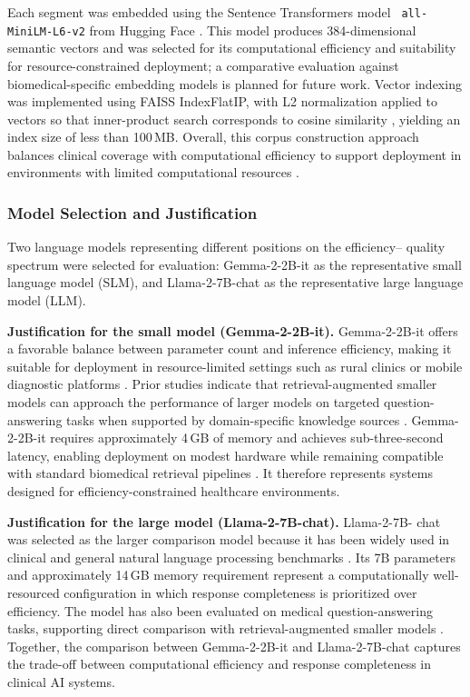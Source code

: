Each segment was embedded using the Sentence Transformers model \texttt{
all-MiniLM-L6-v2} from Hugging Face \cite{gu2020pubmedbert}. This model 
produces 384-dimensional semantic vectors and was selected for its 
computational efficiency and suitability for resource-constrained deployment; 
a comparative evaluation against biomedical-specific embedding models is 
planned for future work. Vector indexing was implemented using FAISS 
IndexFlatIP, with L2 normalization applied to vectors so that inner-product 
search corresponds to cosine similarity \cite{yang2025rag}, 
yielding an index size of less than 100\,MB. Overall, this corpus 
construction approach balances clinical coverage with computational efficiency 
to support deployment in environments with limited computational resources 
\cite{pezoulas2023generative, zamzmi2025smd}.

\subsubsection{Model Selection and Justification}

Two language models representing different positions on the efficiency--
quality spectrum were selected for evaluation: Gemma-2-2B-it  as the representative small language model (SLM), and 
Llama-2-7B-chat as the 
representative large language model (LLM).

\textbf{Justification for the small model (Gemma-2-2B-it).} Gemma-2-2B-it 
offers a favorable balance between parameter count and inference efficiency, 
making it suitable for deployment in resource-limited settings such as rural 
clinics or mobile diagnostic platforms \cite{xiong2024rag}. Prior studies 
indicate that retrieval-augmented smaller models can approach the performance 
of larger models on targeted question-answering tasks when supported by 
domain-specific knowledge sources \cite{yang2025rag, nishizaki2025reducing}. 
Gemma-2-2B-it requires approximately 4\,GB of memory and achieves 
sub-three-second latency, enabling deployment on modest hardware while 
remaining compatible with standard biomedical retrieval pipelines \cite{
zakka2023retrieval}. It therefore represents systems designed for 
efficiency-constrained healthcare environments.

\textbf{Justification for the large model (Llama-2-7B-chat).} Llama-2-7B-
chat was selected as the larger comparison model because it has been widely 
used in clinical and general natural language processing benchmarks \cite{
singhal2025toward}. Its 7B parameters and approximately 14\,GB memory 
requirement represent a computationally well-resourced configuration in which 
response completeness is prioritized over efficiency. The 
model has also been evaluated on medical question-answering tasks, supporting 
direct comparison with retrieval-augmented smaller models \cite{
amugongo2025retrieval}. Together, the comparison between Gemma-2-2B-it and 
Llama-2-7B-chat captures the trade-off between computational efficiency and 
response completeness in clinical AI systems.

